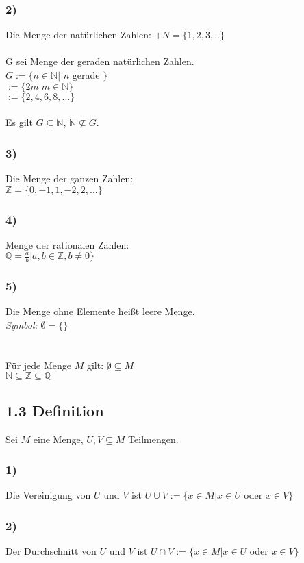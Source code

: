 \documentclass[11pt, oneside, a4paper]{article}
\begin{document}
\subsubsection*{2)}
Die Menge der natürlichen Zahlen: $\mathbb+{N}=\{1,2,3,..\}$ \\ \\
G sei Menge der geraden natürlichen Zahlen. \\
$G := \{n \in \mathbb{N} |$ $n$ gerade $\}$ \\
\hphantom{spaces}$ := \{2m | m \in \mathbb{N}\}$ \\
\hphantom{spaces}$ := \{2,4,6,8,...\}$ \\ \\
Es gilt $G \subseteq \mathbb{N}$, $\mathbb{N} \not \subseteq G$.
\subsubsection*{3)}
Die Menge der ganzen Zahlen: \\
$\mathbb{Z} = \{0,-1,1,-2,2,...\}$
\subsubsection*{4)}
Menge der rationalen Zahlen: \\
$\mathbb{Q} = \frac{a}{b} | a,b \in \mathbb{Z}, b \not = 0\}$
\subsubsection*{5)}
Die Menge ohne Elemente heißt \underline{leere Menge}. \\
\textit{Symbol:} $\emptyset = \{\}$ \\ \\
 \\
\hphantom{spaces} Für jede Menge $M$ gilt: $\emptyset \subseteq M$ \\
\hphantom{spaces} $\mathbb{N} \subseteq \mathbb{Z} \subseteq \mathbb{Q}$
\subsection*{1.3 Definition}
Sei $M$ eine Menge, $U,V \subseteq M$ Teilmengen.
\subsubsection*{1)}
Die Vereinigung von $U$ und $V$ ist $U \cup V := \{x \in M | x \in U$ oder $x \in V\}$
\subsubsection*{2)}
Der Durchschnitt von $U$ und $V$ ist $U \cap V := \{x \in M | x \in U$ oder $x \in V\}$
\end{document}
